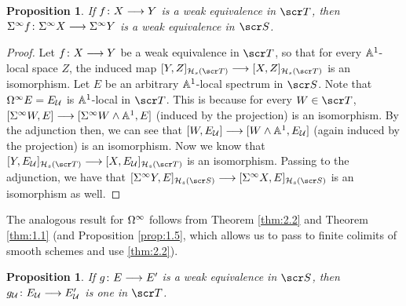 \documentclass{amsart}
\newtheorem{prop}[thm]{Proposition}
\theoremstyle{definition}
\begin{document}
\begin{prop}
If $f \colon X \longrightarrow Y$ is a weak equivalence in $\sT$, then $\Sigma^{\infty}f \colon \Sigma^{\infty} X \longrightarrow \Sigma^{\infty} Y$ is a weak equivalence in $\sS$.
\end{prop}
\begin{proof}
Let $f \colon X \longrightarrow Y$ be a weak equivalence in $\sT$, so that for every $\mathbb{A}^1$-local space $Z$, the induced map $[Y,Z]_{\oH_s(\sT)} \rtarr [X,Z]_{\oH_s(\sT)}$ is an isomorphism. Let $E$ be an arbitrary $\mathbb{A}^1$-local spectrum in $\sS$. Note that $\Omega^{\infty}E = E_{{\mathcal{U}}}$ is $\mathbb{A}^1$-local in $\sT$. This is because for every $W \in \sT$, $[\Sigma^{\infty}W,E] \longrightarrow [\Sigma^{\infty}W \wedge \mathbb{A}^1, E]$ (induced by the projection) is an isomorphism. By the adjunction then, we can see that $[W,E_{{\mathcal{U}}}] \longrightarrow [W \wedge \mathbb{A}^1, E_{{\mathcal{U}}}]$ (again induced by the projection) is an isomorphism. Now we know that $[Y,E_{\oU}]_{\oH_s(\sT)} \rtarr [X,E_{\oU}]_{\oH_s(\sT)}$ is an isomorphism. Passing to the adjunction, we have that $[\SI^{\infty}Y,E]_{\oH_s(\sS)} \rtarr [\SI^{\infty}X,E]_{\oH_s(\sS)}$ is an isomorphism as well. 
\end{proof}

The analogous result for $\Omega^{\infty}$ follows from Theorem \ref{thm:2.2} and Theorem \ref{thm:1.1} (and Proposition \ref{prop:1.5}, which allows us to pass to finite colimits of smooth schemes and use \ref{thm:2.2}).
\begin{prop}\label{prop:2.3}
If $g \colon E \longrightarrow E'$ is a weak equivalence in $\sS$, then $g_{{\mathcal{U}}} \colon E_{{\mathcal{U}}} \longrightarrow E_{{\mathcal{U}}}'$ is one in $\sT$.
\end{prop}
\end{document}
